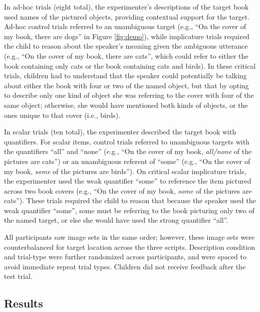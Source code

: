 \documentclass[man]{apa2}
\begin{document}
In ad-hoc trials (eight total), the experimenter's descriptions of the target book used names of the pictured objects, providing contextual support for the target. Ad-hoc control trials referred to an unambiguous target (e.g., ``On the cover of my book, there are dogs'' in Figure \ref{fig:demo}), while implicature trials required the child to reason about the speaker's meaning given the ambiguous utterance (e.g., ``On the cover of my book, there are cats'', which could refer to either the book containing only cats or the book containing cats and birds). In these critical trials, children had to understand that the speaker could potentially be talking about either the book with four or two of the named object, but that by opting to describe only one kind of object she was referring to the cover with four of the same object; otherwise, she would have mentioned both kinds of objects, or the ones unique to that cover (i.e., birds). 

In scalar trials (ten total), the experimenter described the target book with quantifiers. For scalar items, control trials referred to unambiguous targets with the quantifiers ``all'' and ``none'' (e.g., ``On the cover of my book, \textit{all/none} of the pictures are cats'') or an unambiguous referent of ``some'' (e.g., ``On the cover of my book, \textit{some} of the pictures are birds''). On critical scalar implicature trials, the experimenter used the weak quantifier ``some'' to reference the item pictured across two book covers (e.g., ``On the cover of my book, \textit{some} of the pictures are cats''). These trials required the child to reason that because the speaker used the weak quantifier ``some'', some must be referring to the book picturing only two of the named target, or else she would have used the strong quantifier ``all''. 

All participants saw image sets in the same order; however, these image sets were counterbalanced for target location across the three scripts. Description condition and trial-type were further randomized across participants, and were spaced to avoid immediate repeat trial types. Children did not receive feedback after the test trial.

\subsection{Results}
\end{document}
